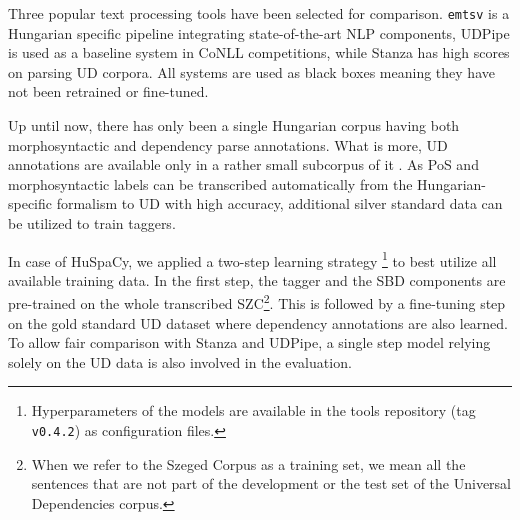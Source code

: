 \documentclass{llncs}
\newcommand{\emtsv}{\texttt{emtsv}}
\newcommand{\udpipe}{UDPipe}
\newcommand{\stanza}{Stanza}
\newcommand{\huspacy}{HuSpaCy}
\begin{document}


Three popular text processing tools have been selected for comparison. \emtsv{} is a Hungarian specific pipeline integrating state-of-the-art NLP components, \udpipe{} is used as a baseline system in CoNLL competitions, while \stanza{} has high scores on parsing UD corpora. All systems are used  as black boxes meaning they have not been retrained or fine-tuned. 


Up until now, there has only been a single Hungarian corpus \citep{szegedcorpus} having both morphosyntactic and dependency parse annotations. What is more, UD annotations are available only in a rather small subcorpus of it \citep{UniDep}. As PoS and morphosyntactic labels can be transcribed automatically from the Hungarian-specific formalism to UD with high accuracy, additional silver standard data can be utilized to train taggers.

In case of \huspacy{}, we applied a two-step learning strategy
\footnote{Hyperparameters of the models are available in the tool\textquotesingle s repository (tag \texttt{v0.4.2}) as configuration files.} to best utilize all available training data. 
In the first step, the tagger and the SBD components are pre-trained on the whole transcribed SZC\footnote{When we refer to the Szeged Corpus as a training set, we mean all the sentences that are not part of the development or the test set of the Universal Dependencies corpus.}. This is followed by a fine-tuning step on the gold standard UD dataset where dependency annotations are also learned. 
To allow fair comparison with \stanza{} and \udpipe{}, a single step model relying solely on the UD data is also involved in the evaluation. 
\end{document}
